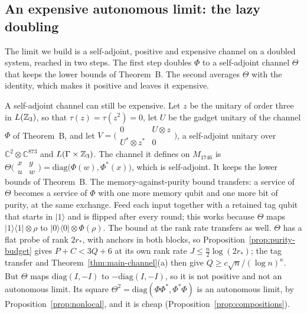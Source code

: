 \subsection{An expensive autonomous limit: the lazy doubling}\label{sec:physics-lazy}

The limit we build is a self-adjoint, positive and expensive channel on a doubled system, reached in two steps. The first step doubles $\Phi$
to a self-adjoint channel $\Theta$ that keeps the lower bounds of Theorem~B. The second averages $\Theta$ with the identity, which makes it
positive and leaves it expensive.

\begin{remark}\label{rem:doubling}
A self-adjoint channel can still be expensive. Let $z$ be the unitary of order three in $L(\mathbb Z_3)$, so that $\tau(z)=\tau(z^2)=0$, let $U$ be the gadget
unitary of the channel $\Phi$ of Theorem~B, and let
$V=\bigl(\begin{smallmatrix}0&U\otimes z\\U^*\otimes z^*&0\end{smallmatrix}\bigr)$, a self-adjoint unitary over $\mathbb C^2\otimes\mathbb C^{873}$ and
$L(\Gamma\times\mathbb Z_3)$. The channel it defines on $M_{1746}$ is
$\Theta\bigl(\begin{smallmatrix}x&y\\u&w\end{smallmatrix}\bigr)=\mathrm{diag}\bigl(\Phi(w),\Phi^*(x)\bigr)$, which is self-adjoint. It keeps the lower bounds of
Theorem~B. The memory-against-purity bound transfers: a service of $\Theta$ becomes a service of $\Phi$ with one more memory qubit and one more
bit of purity, at the same exchange. Feed each input together with a retained tag qubit that starts in $|1\rangle$ and is flipped after every
round; this works because $\Theta$ maps $|1\rangle\langle1|\otimes\rho$ to $|0\rangle\langle0|\otimes\Phi(\rho)$. The bound at the rank rate transfers
as well. $\Theta$ has a flat probe of rank $2r_*$, with anchors in both blocks, so Proposition~\ref{prop:purity-budget} gives $P+C<3Q+6$ at its
own rank rate $J\le\frac n2\log(2r_*)$; the tag transfer and Theorem~\ref{thm:main-channel}(a) then give $Q\ge c\sqrt n/(\log n)^\kappa$. But
$\Theta$ maps $\mathrm{diag}(I,-I)$ to $-\mathrm{diag}(I,-I)$, so it is not positive and not an autonomous limit. Its square
$\Theta^2=\mathrm{diag}(\Phi\Phi^*,\Phi^*\Phi)$ is an autonomous limit, by Proposition~\ref{prop:nonlocal}, and it is cheap
(Proposition~\ref{prop:compositions}).
\end{remark}

